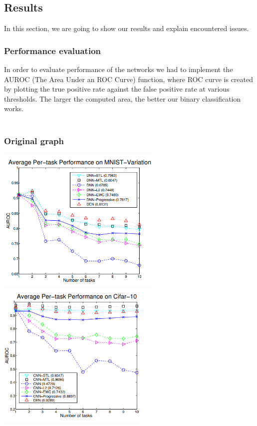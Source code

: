 \documentclass[12pt]{article}
\begin{document}
    \subsection {Results}

    In this section, we are going to show our results and explain encountered issues.

    \subsubsection{Performance evaluation}

    In order to evaluate performance of the networks we had to implement the AUROC (The Area Under an ROC
    Curve) function, where ROC curve is created by plotting the true positive rate against the false
    positive rate at various thresholds. The larger the computed area, the better our binary classification works. 
    \\
    \\
    \subsubsection{Original graph}
    \includegraphics[height=7cm]{paper-mnist-var.png}
    \includegraphics[height=7cm]{paper-cifar-10.png}
\end{document}
